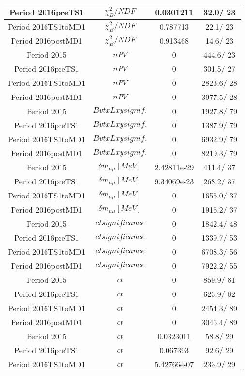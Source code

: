\documentclass{article}
\begin{document}
\begin{longtable}{c|c|c|c}
\hline
 Period 2016preTS1 & $\chi^{2}_{B}/NDF$ & 0.0301211 &  32.0/ 23\\
\hline
 Period 2016TS1toMD1 & $\chi^{2}_{B}/NDF$ & 0.787713 &  22.1/ 23\\
\hline
 Period 2016postMD1 & $\chi^{2}_{B}/NDF$ & 0.913468 &  14.6/ 23\\
\hline
 Period 2015 & $nPV$ & 0 & 444.6/ 23\\
\hline
 Period 2016preTS1 & $nPV$ & 0 & 301.5/ 27\\
\hline
 Period 2016TS1toMD1 & $nPV$ & 0 & 2823.6/ 28\\
\hline
 Period 2016postMD1 & $nPV$ & 0 & 3977.5/ 28\\
\hline
 Period 2015 & $BvtxLxy signif.$ & 0 & 1927.8/ 79\\
\hline
 Period 2016preTS1 & $BvtxLxy signif.$ & 0 & 1387.9/ 79\\
\hline
 Period 2016TS1toMD1 & $BvtxLxy signif.$ & 0 & 6932.9/ 79\\
\hline
 Period 2016postMD1 & $BvtxLxy signif.$ & 0 & 8219.3/ 79\\
\hline
 Period 2015 & $\delta m_{\mu\mu} [MeV]$ & 2.42811e-29 & 411.4/ 37\\
\hline
 Period 2016preTS1 & $\delta m_{\mu\mu} [MeV]$ & 9.34069e-23 & 268.2/ 37\\
\hline
 Period 2016TS1toMD1 & $\delta m_{\mu\mu} [MeV]$ & 0 & 1656.0/ 37\\
\hline
 Period 2016postMD1 & $\delta m_{\mu\mu} [MeV]$ & 0 & 1916.2/ 37\\
\hline
 Period 2015 & $ct significance$ & 0 & 1842.4/ 48\\
\hline
 Period 2016preTS1 & $ct significance$ & 0 & 1339.7/ 53\\
\hline
 Period 2016TS1toMD1 & $ct significance$ & 0 & 6708.3/ 56\\
\hline
 Period 2016postMD1 & $ct significance$ & 0 & 7922.2/ 55\\
\hline
 Period 2015 & $ct$ & 0 & 859.9/ 81\\
\hline
 Period 2016preTS1 & $ct$ & 0 & 623.9/ 82\\
\hline
 Period 2016TS1toMD1 & $ct$ & 0 & 2454.3/ 89\\
\hline
 Period 2016postMD1 & $ct$ & 0 & 3046.4/ 89\\
\hline
 Period 2015 & $ct$ & 0.0323011 &  58.8/ 29\\
\hline
 Period 2016preTS1 & $ct$ & 0.067393 &  92.6/ 29\\
\hline
 Period 2016TS1toMD1 & $ct$ & 5.42766e-07 & 233.9/ 29\\

\end{longtable}
\end{document}
